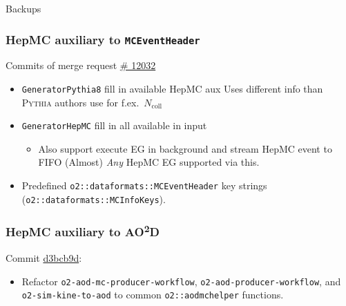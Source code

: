 \documentclass[compress,table,8pt]{beamer}
\newcommand\AOD{AO\textsuperscript{2}D}
\newcommand\Pythia{{\scshape Pythia}}
\begin{document}
\begin{frame}
  \vfill
  {\Huge Backups}\\[2ex]
  \vfill
\end{frame}

\begin{frame}
  \frametitle{HepMC auxiliary to \texttt{MCEventHeader}}

  {Commits of merge request \alert{\href{https://github.com/AliceO2Group/AliceO2/pull/12032/commits}{\# 12032}}}

  \begin{itemize}[<+->]
  \item \texttt{GeneratorPythia8} fill in available HepMC aux\newline
    {\footnotesize Uses different info than \Pythia{} authors use for
      f.ex.~$N_{\mathrm{coll}}$}
  \item \texttt{GeneratorHepMC} fill in all available in input
    \begin{itemize}
    \item Also support execute EG in background and stream HepMC event
      to FIFO\newline
      (Almost) \emph{Any} HepMC EG supported via this.
    \end{itemize}
  \item Predefined \texttt{o2::dataformats::MCEventHeader} key strings
    (\texttt{o2::dataformats::MCInfoKeys}).
  \end{itemize}

\end{frame}

\begin{frame}
  \frametitle{HepMC auxiliary to \AOD{}}

  {Commit
    \alert{\href{https://github.com/AliceO2Group/AliceO2/commit/d3bcb9d5c98a14618e100c4d476103b8f5989ae1}{d3bcb9d}}}:

  \begin{itemize}[<+->]
  \item Refactor \texttt{o2-aod-mc-producer-workflow},
    \texttt{o2-aod-producer-workflow}, and \texttt{o2-sim-kine-to-aod}
    to common \texttt{o2::aodmchelper} functions.
  \end{itemize}

\end{frame}
\end{document}
